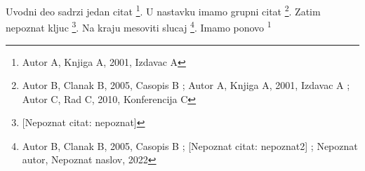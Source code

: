 \documentclass{article}
\begin{document}
Uvodni deo sadrzi jedan citat \footnote{Autor A, Knjiga A, 2001, Izdavac A}.  
U nastavku imamo grupni citat \footnote{Autor B, Clanak B, 2005, Casopis B ; Autor A, Knjiga A, 2001, Izdavac A ; Autor C, Rad C, 2010, Konferencija C}.  
Zatim nepoznat kljuc \footnote{[Nepoznat citat: nepoznat]}.  
Na kraju mesoviti slucaj \footnote{Autor B, Clanak B, 2005, Casopis B ; [Nepoznat citat: nepoznat2] ; Nepoznat autor, Nepoznat naslov, 2022}.
Imamo ponovo \textsuperscript{1}
\end{document}
